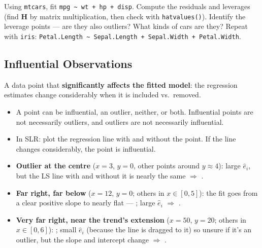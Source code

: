 \begin{exercise}
    Using \texttt{mtcars}, fit \texttt{mpg \textasciitilde{} wt + hp + disp}. Compute the
    residuals and leverages (find $\mathbf{H}$ by matrix multiplication, then check with
    \texttt{hatvalues()}). Identify the leverage points --- are they also outliers? What kinds
    of cars are they? Repeat with \texttt{iris}:
    \texttt{Petal.Length \textasciitilde{} Sepal.Length + Sepal.Width + Petal.Width}.
\end{exercise}

\subsection{Influential Observations}

\begin{definition}
    A data point that \textbf{significantly affects the fitted model}: the regression estimates
    change considerably when it is included vs.\ removed.
    \begin{itemize}
        \item A point can be influential, an outlier, neither, or both. Influential points are not
        necessarily outliers, and outliers are not necessarily influential.
        \item In SLR: plot the regression line with and without the point. If the line changes
        considerably, the point is influential.
    \end{itemize}
\end{definition}

\begin{example}
    \begin{itemize}
        \item \textbf{Outlier at the centre} ($x=3$, $y=0$, other points around $y\approx4$): large
        $\hat e_i$, but the LS line with and without it is nearly the same $\Rightarrow$
        .
        \item \textbf{Far right, far below} ($x=12$, $y=0$; others in $x\in[0,5]$): the fit goes
        from a clear positive slope to nearly flat --- ; large $\hat e_i$ $\Rightarrow$ .
        \item \textbf{Very far right, near the trend's extension} ($x=50$, $y=20$; others in
        $x\in[0,6]$): ; small $\hat e_i$ (because the line is dragged to
        it) so unsure if it's an outlier, but the slope and intercept change $\Rightarrow$
        .
    \end{itemize}
\end{example}

